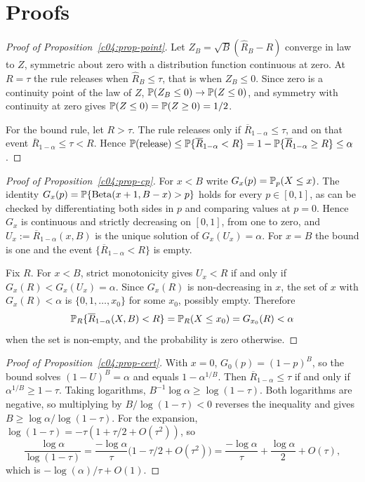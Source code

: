 \section{Proofs}

\begin{proof}[Proof of Proposition~\ref{c04:prop-point}]
Let $Z_B = \sqrt{B}(\widehat R_B - R)$ converge in law to $Z$, symmetric about zero with
a distribution function continuous at zero. At $R = \tau$ the rule releases when
$\widehat R_B \le \tau$, that is when $Z_B \le 0$. Since zero is a continuity point of
the law of $Z$, $\mathbb{P}(Z_B \le 0) \to \mathbb{P}(Z \le 0)$, and symmetry with continuity at
zero gives $\mathbb{P}(Z \le 0) = \mathbb{P}(Z \ge 0) = 1/2$.

For the bound rule, let $R > \tau$. The rule releases only if
$\overline{R}_{1-\alpha} \le \tau$, and on that event $\overline{R}_{1-\alpha} \le \tau
< R$. Hence
$\mathbb{P}(\text{release}) \le \mathbb{P}\{\overline{R}_{1-\alpha} < R\} = 1 -
\mathbb{P}\{\overline{R}_{1-\alpha} \ge R\} \le \alpha$.
\end{proof}

\begin{proof}[Proof of Proposition~\ref{c04:prop-cp}]
For $x < B$ write $G_x(p) = \mathbb{P}_p(X \le x)$. The identity
$G_x(p) = \mathbb{P}\{\mathrm{Beta}(x+1,B-x) > p\}$ holds for every $p \in [0,1]$, as can be
checked by differentiating both sides in $p$ and comparing values at $p = 0$. Hence
$G_x$ is continuous and strictly decreasing on $[0,1]$, from one to zero, and
$U_x := \overline{R}_{1-\alpha}(x,B)$ is the unique solution of $G_x(U_x) = \alpha$. For
$x = B$ the bound is one and the event $\{\overline{R}_{1-\alpha} < R\}$ is empty.

Fix $R$. For $x < B$, strict monotonicity gives $U_x < R$ if and only if
$G_x(R) < G_x(U_x) = \alpha$. Since $G_x(R)$ is non-decreasing in $x$, the set of $x$
with $G_x(R) < \alpha$ is $\{0,1,\dots,x_0\}$ for some $x_0$, possibly empty. Therefore
\[
\mathbb{P}_R\{\overline{R}_{1-\alpha}(X,B) < R\} = \mathbb{P}_R(X \le x_0) = G_{x_0}(R) < \alpha
\]
when the set is non-empty, and the probability is zero otherwise.
\end{proof}

\begin{proof}[Proof of Proposition~\ref{c04:prop-cert}]
With $x = 0$, $G_0(p) = (1-p)^B$, so the bound solves $(1-U)^B = \alpha$ and equals
$1 - \alpha^{1/B}$. Then $\overline{R}_{1-\alpha} \le \tau$ if and only if
$\alpha^{1/B} \ge 1-\tau$. Taking logarithms, $B^{-1}\log\alpha \ge \log(1-\tau)$.
Both logarithms are negative, so multiplying by $B/\log(1-\tau) < 0$ reverses the
inequality and gives $B \ge \log\alpha/\log(1-\tau)$. For the expansion,
$\log(1-\tau) = -\tau(1 + \tau/2 + O(\tau^2))$, so
\[
\frac{\log\alpha}{\log(1-\tau)} = \frac{-\log\alpha}{\tau}\big(1 - \tau/2 + O(\tau^2)\big)
= \frac{-\log\alpha}{\tau} + \frac{\log\alpha}{2} + O(\tau),
\]
which is $-\log(\alpha)/\tau + O(1)$.
\end{proof}

